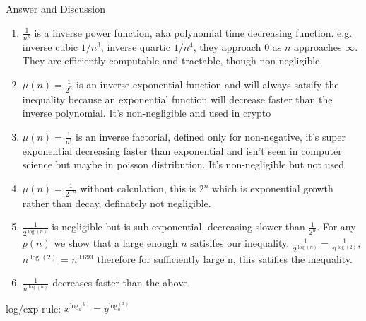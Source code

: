 Answer and Discussion
\begin{enumerate}
    \item $\frac{1}{n^k}$ is a inverse power function, aka polynomial time decreasing function. e.g. inverse cubic $1/n^3$, inverse quartic $1/n^4$, they approach 0 as $n$ approaches $\infty$. They are efficiently computable and tractable, though non-negligible. \\
    \item $\mu(n) = \frac{1}{2^n}$ is an inverse exponential function and will always satsify the inequality because an exponential function will decrease faster than the inverse polynomial.  It's non-negligible and used in crypto\\
    \item $\mu(n) = \frac{1}{n!}$ is an inverse factorial, defined only for non-negative, it's super exponential decreasing faster than exponential and isn't seen in computer science but maybe in poisson distribution. It's non-negligible but not used \\
    \item $\mu(n) = \frac{1}{2^{-n}}$ without calculation, this is $2^n$ which is exponential growth rather than decay, definately not negligible. \\
    \item $\frac{1}{2^{\log(n)}}$ is negligible but is sub-exponential, decreasing slower than $\frac{1}{2^n}$. For any $p(n)$ we show that a large enough $n$ satisifes our inequality. $\frac{1}{2^{\log(n)}} = \frac{1}{n^{\log(2)}}$, $n^{\log(2)}$ = $n^{0.693}$ therefore for sufficiently large n, this satifies the inequality. \\
    \item $\frac{1}{n^{\log(n)}}$ decreases faster than the above
\end{enumerate}
log/exp rule: $x^{\log_a^{(y)}} = y^{\log_a^{(x)}}$

